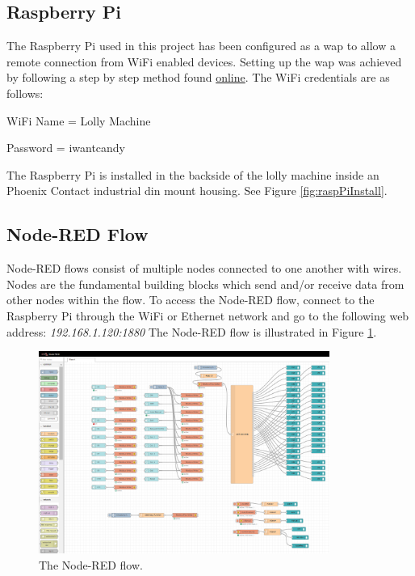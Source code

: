     \subsection{Raspberry Pi}
        The Raspberry Pi used in this project has been configured as a \acrshort{wap} to allow a remote connection from WiFi enabled devices. Setting up the \acrshort{wap} was achieved by following a step by step method found \href{https://raspberrypi-guide.github.io/networking/create-wireless-access-point}{online}\cite{wapSetup}. The WiFi credentials are as follows:
        
        \begin{description}
            \item WiFi Name = Lolly Machine
            \item Password  = iwantcandy 
        \end{description}

        The Raspberry Pi is installed in the backside of the lolly machine inside an Phoenix Contact industrial din mount housing. See Figure \ref{fig:raspPiInstall}.
              
    \subsection{Node-RED Flow}
        Node-RED flows consist of multiple nodes connected to one another with wires. Nodes are the fundamental building blocks which send and/or receive data from other nodes within the flow. To access the Node-RED flow, connect to the Raspberry Pi through the WiFi or Ethernet network and go to the following web address:
        \newline\textit{192.168.1.120:1880}
        The Node-RED flow is illustrated in Figure \ref{fig:nodeRedFlow}.
        \begin{figure}[H]
            \centering
            \includegraphics[width = 0.85\textwidth]{2_images/nodeRedFlow}
            \caption{The Node-RED flow.}
            \label{fig:nodeRedFlow}
        \end{figure}  
        
